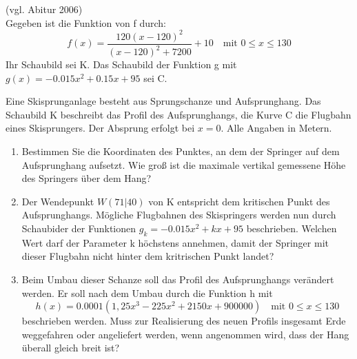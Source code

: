 \aufgabe{} (vgl. Abitur 2006)\\
Gegeben ist die Funktion von f durch:
\begin{equation*}
  f(x)=\frac{120(x-120)^2}{(x-120)^2+7200} + 10 \quad\text{mit $0\leq x \leq 130$}
\end{equation*}
Ihr Schaubild sei K. Das Schaubild der Funktion g mit $g(x)=-0.015x^2+0.15x+95$ sei C.

Eine Skisprunganlage besteht aus Sprungschanze und Aufsprunghang. Das Schaubild K beschreibt das Profil des Aufsprunghangs, die Kurve C die Flugbahn eines Skisprungers. Der Absprung erfolgt bei $x=0$. Alle Angaben in Metern.

\begin{enumerate}
  \item Bestimmen Sie die Koordinaten des Punktes, an dem der Springer auf dem Aufsprunghang aufsetzt. Wie groß ist die maximale vertikal gemessene Höhe des Springers über dem Hang? 
  \item Der Wendepunkt $W(71|40)$ von K entspricht dem kritischen Punkt des Aufsprunghangs. Mögliche Flugbahnen des Skispringers werden nun durch Schaubider der Funktionen $g_k=-0.015x^2+kx+95$ beschrieben. Welchen Wert darf der Parameter k höchstens annehmen, damit der Springer mit dieser Flugbahn nicht hinter dem kritrischen Punkt landet? 
  \item Beim Umbau dieser Schanze soll das Profil des Aufsprunghangs verändert werden. Er soll nach dem Umbau durch die Funktion h mit
  \begin{equation*}
    h(x)=0.0001(1,25x^3-225x^2+2150x+900000) \quad\text{mit $0\leq x \leq 130$}
  \end{equation*}
  beschrieben werden. Muss zur Realisierung des neuen Profils insgesamt Erde weggefahren oder angeliefert werden, wenn angenommen wird, dass der Hang überall gleich breit ist? 
\end{enumerate}
